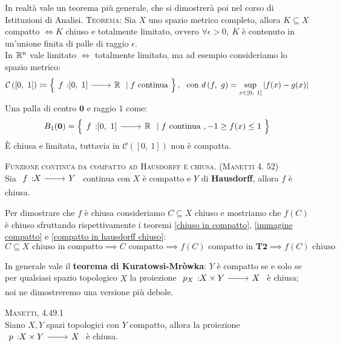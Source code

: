\begin{digression}
In realtà vale un teorema più generale, che si dimostrerà poi nel corso di Istituzioni di Analisi.
\textsc{Teorema:} Sia $X$ uno spazio metrico completo, allora $K\subseteq X$ compatto $\iff K$ chiuso e totalmente limitato, ovvero $\forall\epsilon >0, \ K$ è contenuto in un'unione finita di palle di raggio $\epsilon$.\\
In $\mathbb{R}^n$ vale limitato $\iff$ totalmente limitato, ma ad esempio consideriamo lo spazio metrico:
	\begin{gather*}
		\mathcal{C}\left( [0, \ 1] \right) \coloneqq \left\{ \funz f {[0,\ 1]} \realset \mid f \text{ continua } \right\},  \ \ \text{con } \mvf{d}{f}{g} =\sup_{x\in [0, \ 1]} |f(x)-g(x)|
	\end{gather*}
Una palla di centro $\mathbf{0}$ e raggio $1$ come:
\begin{equation*}
	B_1(\mathbf{0})=\left\{ \funz f {[0,\ 1]} \realset \mid f \text{ continua }, -1\geq f(x) \leq 1 \ \right\}
\end{equation*}
È chiusa e limitata, tuttavia in $	\mathcal{C}\left( [0, \ 1] \right)$ non è compatta.
\end{digression}
\begin{theorema}\textsc{Funzione continua da compatto ad Hausdorff è chiusa}. \textsc{(Manetti 4. 52)} \label{da compatto in T_2 è chiuso} \\
	Sia $\funz f X Y$ continua con $X$ è compatto e $Y$ di \textbf{Hausdorff}, allora $f$ è chiusa.
\end{theorema}
\begin{demonstration}
	Per dimostrare che $f$ è chiusa consideriamo $C\subseteq X$ chiuso e mostriamo che $f(C)$ è chiuso sfruttando rispettivamente i teoremi \ref{chiuso in compatto}, \ref{immagine compatto} e \ref{compatto in hausdorff chiuso}:
		\begin{equation*}
			C\subseteq X \text{ chiuso in compatto} \implies C \text{ compatto} \implies f(C) \text{ compatto in } \textbf{T2} \implies f(C) \text{ chiuso}
		\end{equation*}
\end{demonstration}
In generale vale il \textbf{teorema di Kuratowsi-Mròwka}: $Y$ è compatto se e solo se per qualsiasi spazio topologico $X$ la proiezione $\funz {p_X} {X\times Y} X$ è chiusa; noi ne dimostreremo una versione più debole.
\begin{theorema} \textsc{Manetti, 4.49.1} \\
	Siano $X,Y$ spazi topologici con $Y$ compatto, allora la proiezione $\funz p {X\times Y} X$ è chiusa.
\end{theorema}
